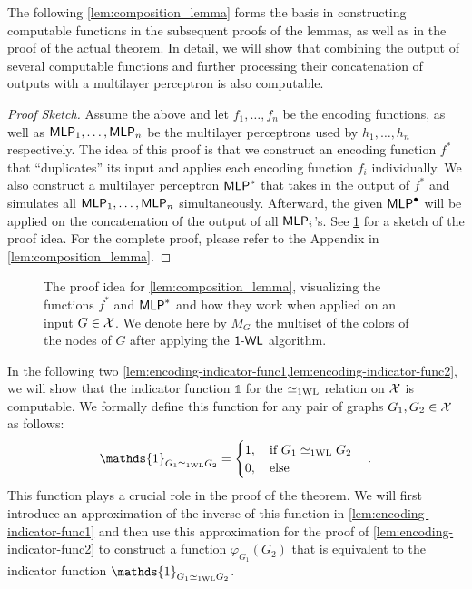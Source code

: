 The following \cref{lem:composition_lemma} forms the basis in constructing \wlnn computable functions in the subsequent proofs of the lemmas, as well as in the proof of the actual theorem. In detail, we will show that combining the output of several \wlnn computable functions and further processing their concatenation of outputs with a multilayer perceptron is also \wlnn computable.
\begin{proof}[Proof Sketch]\renewcommand{\qedsymbol}{}
    Assume the above and let $f_{1}, \ldots, f_{n}$ be the encoding functions, as well as $\textsf{MLP}_1, \ldots, \textsf{MLP}_n$ be the multilayer perceptrons used by $h_1, \dots, h_n$ respectively. The idea of this proof is that we construct an encoding function $f^*$ that ``duplicates'' its input and applies each encoding function $f_i$ individually. We also construct a multilayer perceptron $\textsf{MLP}^*$ that takes in the output of $f^*$ and simulates all $\textsf{MLP}_1, \ldots, \textsf{MLP}_n$ simultaneously. Afterward, the given $\textsf{MLP}^\bullet$ will be applied on the concatenation of the output of all $\textsf{MLP}_i$'s. See \cref{fig:proof_idea_parallelism} for a sketch of the proof idea. For the complete proof, please refer to the Appendix in \cref{lem:composition_lemma}.
\end{proof}

\begin{figure}[H]
    \centering
    
    \caption{The proof idea for \cref{lem:composition_lemma}, visualizing the functions $f^*$ and $\textsf{MLP}^*$ and how they work when applied on an input $G \in \mathcal{X}$. We denote here by $M_G$ the multiset of the colors of the nodes of $G$ after applying the $\textsf{1-WL}$ algorithm.}
    \label{fig:proof_idea_parallelism}
\end{figure}


In the following two \cref{lem:encoding-indicator-func1,lem:encoding-indicator-func2}, we will show that the indicator function $\mathds{1}$ for the $\simeq_{\text{1WL}}$ relation on $\mathcal{X}$ is \wlnn computable. We formally define this function for any pair of graphs $G_1, G_2 \in \mathcal{X}$ as follows:
\begin{equation*}
    \mathds{1}_{G_1 \wliso G_2} = \begin{cases}
        1, \quad \text{if $G_1 \wliso G_2$}\\
        0, \quad \text{else}
    \end{cases}.
\end{equation*}
This function plays a crucial role in the proof of the theorem. We will first introduce an approximation of the inverse of this function in \cref{lem:encoding-indicator-func1} and then use this approximation for the proof of \cref{lem:encoding-indicator-func2} to construct a function $\varphi_{G_1}(G_2)$ that is equivalent to the indicator function $\mathds{1}_{G_1 \wliso G_2}$.


